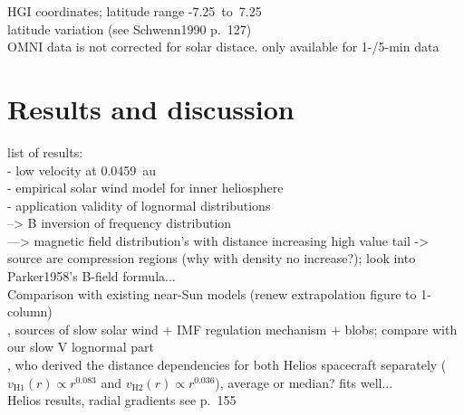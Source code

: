 
HGI coordinates; latitude range -7.25\degr{}~to~7.25\degr{}\\
latitude variation (see Schwenn1990 p.~127)\\

OMNI data is not corrected for solar distace. only available for 1-/5-min data\\



\section{Results and discussion}

list of results:\\
- low velocity at 0.0459~au\\
- empirical solar wind model for inner heliosphere\\
- application validity of lognormal distributions\\
--> B inversion of frequency distribution\\
---> magnetic field distribution's with distance increasing high value tail -> source are compression regions (why with density no increase?); look into Parker1958's B-field formula...\\

Comparison with existing near-Sun models (renew extrapolation figure to 1-column)\\

\citet{Wang2000}, sources of slow solar wind + IMF regulation mechanism + blobs; compare with our slow V lognormal part\\

\citet{Schwenn1983,Schwenn1990}, who derived the distance dependencies for both Helios spacecraft separately ($v_\text{H1}(r) \propto r^{0.083}$ and $v_\text{H2}(r) \propto r^{0.036}$), average or median? fits well...\\
Helios results, radial gradients see \citet{Schwenn1990} p.~155\\

